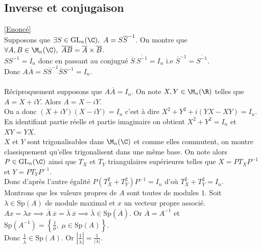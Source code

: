 \documentclass[8pt]{book}
\begin{document}
	\subsection{Inverse et conjugaison}
	\label{Inverse et conjugaison corrigé}
	\textcolor{blue}{\hyperref[Inverse et conjugaison]{[Enoncé]}}\\
	Supposons que $\exists S\in \text{GL}_n(\C),\ A=S{\overline S}^{-1}$. On montre que $\forall A,B\in \M_n(\C),\ \overline{AB}=\overline A\times\overline B$.\\
	$SS^{-1}=I_n$ donc en passant au conjugué $\overline S\ \overline{S^{-1}}=I_n$ i.e ${\overline S}^{-1}=\overline{S^{-1}}$.\\
	Donc $A\overline A=S{\overline S}^{-1}\overline SS^{-1}=I_n$.\\\\
	Réciproquement supposons que $A\overline A=I_n$. On note $X,Y\in \M_n(\R)$ telles que $A=X+iY$. Alors $A=X-iY$.\\
	On a donc $(X+iY)(X-iY)=I_n$ c'est à dire $X^2+Y^2+i(YX-XY)=I_n$. En identifiant partie réelle et partie imaginaire on obtient $X^2+Y^2=I_n$ et $XY=YX$.\\
	$X$ et $Y$ sont trigonalisables dans $\M_n(\C)$ et comme elles commutent, on montre classiquement qu'elles trigonalisent dans une même base. On note alors $P\in \text{GL}_n(\C)$ ainsi que $T_X$ et $T_Y$ triangulaires supérieures telles que $X=PT_XP^{-1}$ et $Y=PT_YP^{-1}$.\\
	Donc d'après l'autre égalité $P(T_X^2+T_Y^2)P^{-1}=I_n$ d'où $T_X^2+T_Y^2=I_n$.\\
	Montrons que les valeurs propres de $A$ sont toutes de modules $1$. Soit $\lambda\in \text{Sp}(A)$ de module maximal et $x$ un vecteur propre associé. $Ax=\lambda x\implies \overline A\ \overline x=\overline \lambda\ \overline x\implies \overline \lambda\in \text{Sp}(\overline A)$. Or $\overline A=A^{-1}$ et $\text{Sp}(A^{-1})=\displaystyle\left\{\frac{1}{\mu},\ \mu\in \text{Sp}(A)\right\}$.\\
	Donc $\displaystyle\frac{1}{\overline \lambda}\in \text{Sp}(A)$. Or $\displaystyle\left|\frac{1}{\overline \lambda}\right|=\frac{1}{|\lambda|}$.
	
\end{document}
